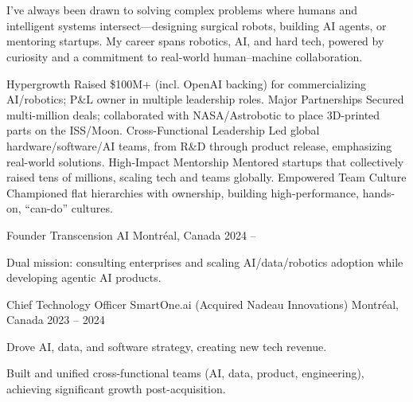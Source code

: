 \documentclass[11pt, letterpaper]{awesome-cv}
\begin{document}
\makecvheader

\begin{cvparagraph}
\\
\\
I've always been drawn to solving complex problems where humans and intelligent systems intersect—designing surgical robots, building AI agents, or mentoring startups. My career spans robotics, AI, and hard tech, powered by curiosity and a commitment to real-world human–machine collaboration.
\end{cvparagraph}

\begin{cvskills}
  \cvskill
    {Hypergrowth}
    {Raised \$100M+ (incl. OpenAI backing) for commercializing AI/robotics; P\&L owner in multiple leadership roles.}
  \cvskill
    {Major Partnerships}
    {Secured multi-million deals; collaborated with NASA/Astrobotic to place 3D-printed parts on the ISS/Moon.}
  \cvskill
    {Cross-Functional Leadership}
    {Led global hardware/software/AI teams, from R\&D through product release, emphasizing real-world solutions.}
  \cvskill
    {High-Impact Mentorship}
    {Mentored startups that collectively raised tens of millions, scaling tech and teams globally.}
  \cvskill
    {Empowered Team Culture}
    {Championed flat hierarchies with ownership, building high-performance, hands-on, “can-do” cultures.}
\end{cvskills}


\cventry
    {Founder}
    {Transcension AI}
    {Montréal, Canada}
    {2024 -- }
    {
      \begin{cvitems}
        \item {Dual mission: consulting enterprises and scaling AI/data/robotics adoption while developing agentic AI products.}
      \end{cvitems}
    }

\cventry
    {Chief Technology Officer}
    {SmartOne.ai (Acquired Nadeau Innovations)}
    {Montréal, Canada}
    {2023 -- 2024}
    {
      \begin{cvitems}
        \item {Drove AI, data, and software strategy, creating new tech revenue.}
        \item {Built and unified cross-functional teams (AI, data, product, engineering), achieving significant growth post-acquisition.}
      \end{cvitems}
    }
\end{document}
